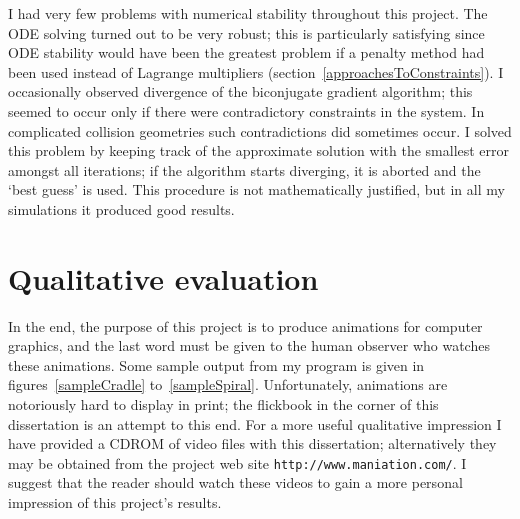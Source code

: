 I had very few problems with numerical stability throughout this project. The ODE solving turned
out to be very robust; this is particularly satisfying since ODE stability would have been the
greatest problem if a penalty method had been used instead of Lagrange multipliers
(section~\ref{approachesToConstraints}). I occasionally observed divergence of the biconjugate
gradient algorithm; this seemed to occur only if there were contradictory constraints in the
system. In complicated collision geometries such contradictions did sometimes occur. I solved this
problem by keeping track of the approximate solution with the smallest error amongst all
iterations; if the algorithm starts diverging, it is aborted and the `best guess' is used.
This procedure is not mathematically justified, but in all my simulations it produced good results.


\section{Qualitative evaluation}

In the end, the purpose of this project is to produce animations for computer graphics, and the
last word must be given to the human observer who watches these animations. Some sample output
from my program is given in figures~\ref{sampleCradle} to~\ref{sampleSpiral}. Unfortunately,
animations are notoriously hard to display in print; the flickbook in the corner of this
dissertation is an attempt to this end. For a more useful qualitative impression I have provided
a CDROM of video files with this dissertation; alternatively they may be obtained from the
project web site \texttt{http://www.maniation.com/}. I suggest that the reader should watch
these videos to gain a more personal impression of this project's results.

